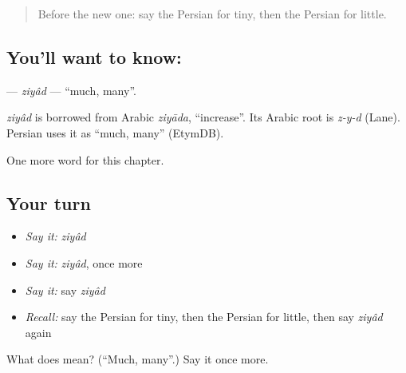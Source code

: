 \label{lesson:FA-C130-ziyad}



\begin{quote}
Before the new one: say the Persian for tiny, then the Persian for little.
\end{quote}

\subsection*{You'll want to know: }
\textbf{} — \emph{ziyâd} — \textquotedblleft{}much, many\textquotedblright{}.

\begin{cousinweb}
\emph{ziyâd} is borrowed from Arabic \emph{ziyāda}, \textquotedblleft{}increase\textquotedblright{}. Its Arabic root is \emph{z-y-d} (Lane). Persian uses it as \textquotedblleft{}much, many\textquotedblright{} (EtymDB).
\end{cousinweb}

\begin{grammarlens}[title={What you've built}]
One more word for this chapter.
\end{grammarlens}

\subsection*{Your turn}
\begin{itemize}
\raggedright
  \item \emph{Say it:} \emph{ziyâd}
  \item \emph{Say it:} \emph{ziyâd}, once more
  \item \emph{Say it:} say \emph{ziyâd}
  \item \emph{Recall:} say the Persian for tiny, then the Persian for little, then say \emph{ziyâd} again
\end{itemize}

\begin{tcolorbox}[breakable,colback=teal!4,colframe=teal!35!black,title={Before you move on}]
What does  mean? (\textquotedblleft{}Much, many\textquotedblright{}.) Say it once more.
\end{tcolorbox}
